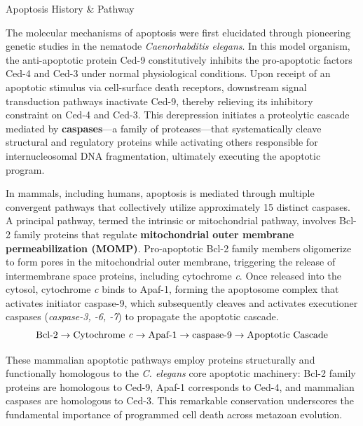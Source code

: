 \documentclass[10pt]{article}
\begin{document}
    \begin{core}{Apoptosis History \& Pathway}

      The molecular mechanisms of apoptosis were first elucidated through pioneering genetic studies in the nematode \textit{Caenorhabditis elegans}. In this model organism, the anti-apoptotic protein Ced-9 constitutively inhibits the pro-apoptotic factors Ced-4 and Ced-3 under normal physiological conditions. Upon receipt of an apoptotic stimulus via cell-surface death receptors, downstream signal transduction pathways inactivate Ced-9, thereby relieving its inhibitory constraint on Ced-4 and Ced-3. This derepression initiates a proteolytic cascade mediated by \textbf{caspases}---a family of proteases---that systematically cleave structural and regulatory proteins while activating others responsible for internucleosomal DNA fragmentation, ultimately executing the apoptotic program.


      In mammals, including humans, apoptosis is mediated through multiple convergent pathways that collectively utilize approximately 15 distinct caspases. A principal pathway, termed the intrinsic or mitochondrial pathway, involves Bcl-2 family proteins that regulate \textbf{mitochondrial outer membrane permeabilization (MOMP)}. Pro-apoptotic Bcl-2 family members oligomerize to form pores in the mitochondrial outer membrane, triggering the release of intermembrane space proteins, including cytochrome \textit{c}. Once released into the cytosol, cytochrome \textit{c} binds to Apaf-1, forming the apoptosome complex that activates initiator caspase-9, which subsequently cleaves and activates executioner caspases (\textit{caspase-3, -6, -7}) to propagate the apoptotic cascade.
      \[
        \text{Bcl-2} \rightarrow \text{Cytochrome \textit{c}} \rightarrow \text{Apaf-1} \rightarrow \text{caspase-9} \rightarrow \text{Apoptotic Cascade}
      \]

      These mammalian apoptotic pathways employ proteins structurally and functionally homologous to the \textit{C. elegans} core apoptotic machinery: Bcl-2 family proteins are homologous to Ced-9, Apaf-1 corresponds to Ced-4, and mammalian caspases are homologous to Ced-3. This remarkable conservation underscores the fundamental importance of programmed cell death across metazoan evolution.

    \end{core}
\end{document}
